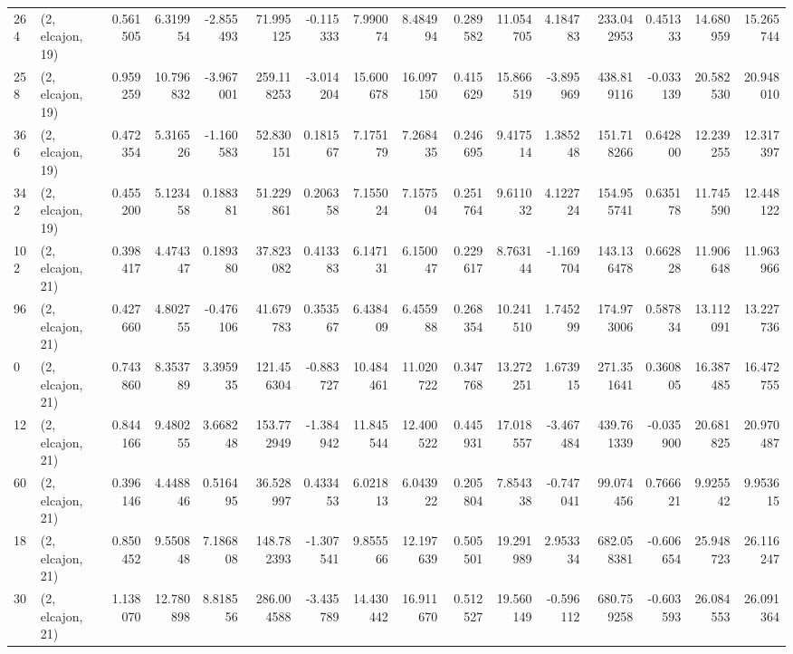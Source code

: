 \begin{tabular}{llrrrrrrrrrrrrrr}
264 &  (2, elcajon, 19) &   0.561505 &   6.319954 &  -2.855493 &    71.995125 &  -0.115333 &   7.990074 &   8.484994 &  0.289582 &  11.054705 &   4.184783 &    233.042953 &    0.451333 &   14.680959 &   15.265744 \\
258 &  (2, elcajon, 19) &   0.959259 &  10.796832 &  -3.967001 &   259.118253 &  -3.014204 &  15.600678 &  16.097150 &  0.415629 &  15.866519 &  -3.895969 &    438.819116 &   -0.033139 &   20.582530 &   20.948010 \\
366 &  (2, elcajon, 19) &   0.472354 &   5.316526 &  -1.160583 &    52.830151 &   0.181567 &   7.175179 &   7.268435 &  0.246695 &   9.417514 &   1.385248 &    151.718266 &    0.642800 &   12.239255 &   12.317397 \\
342 &  (2, elcajon, 19) &   0.455200 &   5.123458 &   0.188381 &    51.229861 &   0.206358 &   7.155024 &   7.157504 &  0.251764 &   9.611032 &   4.122724 &    154.955741 &    0.635178 &   11.745590 &   12.448122 \\
102 &  (2, elcajon, 21) &   0.398417 &   4.474347 &   0.189380 &    37.823082 &   0.413383 &   6.147131 &   6.150047 &  0.229617 &   8.763144 &  -1.169704 &    143.136478 &    0.662828 &   11.906648 &   11.963966 \\
96  &  (2, elcajon, 21) &   0.427660 &   4.802755 &  -0.476106 &    41.679783 &   0.353567 &   6.438409 &   6.455988 &  0.268354 &  10.241510 &   1.745299 &    174.973006 &    0.587834 &   13.112091 &   13.227736 \\
0   &  (2, elcajon, 21) &   0.743860 &   8.353789 &   3.395935 &   121.456304 &  -0.883727 &  10.484461 &  11.020722 &  0.347768 &  13.272251 &   1.673915 &    271.351641 &    0.360805 &   16.387485 &   16.472755 \\
12  &  (2, elcajon, 21) &   0.844166 &   9.480255 &   3.668248 &   153.772949 &  -1.384942 &  11.845544 &  12.400522 &  0.445931 &  17.018557 &  -3.467484 &    439.761339 &   -0.035900 &   20.681825 &   20.970487 \\
60  &  (2, elcajon, 21) &   0.396146 &   4.448846 &   0.516495 &    36.528997 &   0.433453 &   6.021813 &   6.043922 &  0.205804 &   7.854338 &  -0.747041 &     99.074456 &    0.766621 &    9.925542 &    9.953615 \\
18  &  (2, elcajon, 21) &   0.850452 &   9.550848 &   7.186808 &   148.782393 &  -1.307541 &   9.855566 &  12.197639 &  0.505501 &  19.291989 &   2.953334 &    682.058381 &   -0.606654 &   25.948723 &   26.116247 \\
30  &  (2, elcajon, 21) &   1.138070 &  12.780898 &   8.818556 &   286.004588 &  -3.435789 &  14.430442 &  16.911670 &  0.512527 &  19.560149 &  -0.596112 &    680.759258 &   -0.603593 &   26.084553 &   26.091364 \\

\end{tabular}
